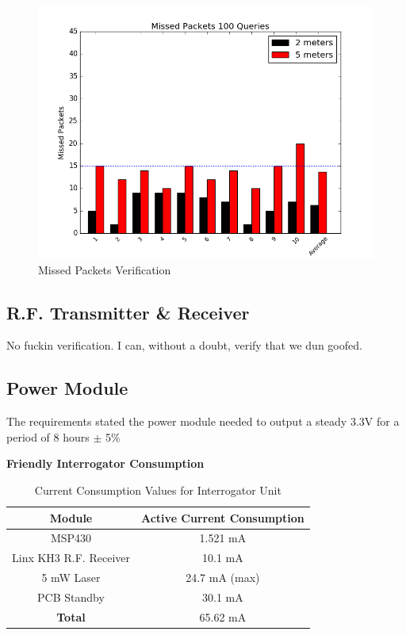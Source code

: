 \documentclass[letterpaper,10pt]{article}
\begin{document}
\begin{spacing}{1.15}
\begin{figure} [H]
	\centering
	\includegraphics[scale=0.45]{transmitted_received.png}
	\caption{Missed Packets Verification\label{fig:transmitted-received}}
\end{figure}

\subsection{R.F. Transmitter \& Receiver}
No fuckin verification. I can, without a doubt, verify that we dun goofed.

\subsection{Power Module}
The requirements stated the power module needed to output a steady 3.3V for a period of 8 hours $\pm$ 5\%

\hspace{5mm}\textbf{Friendly Interrogator Consumption} \label{section:interrogator-consumption}
\begin{table}[htbp]
	\centering
	\begin{tabular}{c|c}	%
		\toprule	%
		Module & Active Current Consumption \\
		\midrule
		MSP430 & 1.521 mA \\ 
		Linx KH3 R.F. Receiver & 10.1 mA \\
		5 mW Laser & 24.7 mA (max) \\
		PCB Standby & 30.1 mA \\
		\bottomrule	%
		\textbf{Total} & 65.62 mA \\
	\end{tabular}%
	\caption{Current Consumption Values for Interrogator Unit}
	\label{tab:table2}	%
\end{table}%



\end{spacing}
\end{document}
